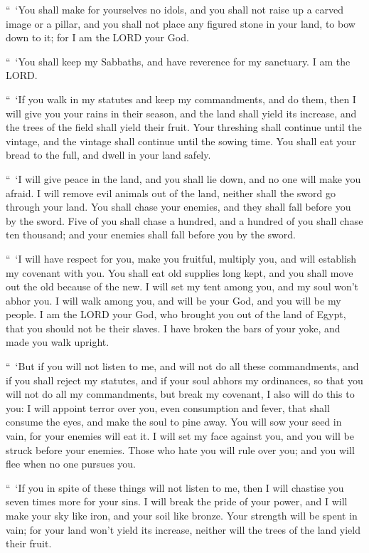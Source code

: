 \mychapter{} \myverse*{}“ ‘You shall make for yourselves no idols, and you shall not raise
up a carved image or a pillar, and you shall not place any figured stone in your land, to bow down to
it; for I am the LORD your God.


\myverse{}“ ‘You shall keep my Sabbaths, and have reverence for my sanctuary.
I am the LORD.


\myverse{}“ ‘If you walk in my statutes and keep my commandments, and do
them,
\myverse{}then I will give you your rains in their season, and the land shall yield its
increase, and the trees of the field shall yield their fruit.
\myverse{}Your threshing shall continue until the vintage, and the vintage shall continue
until the sowing time. You shall eat your bread to the full, and dwell in your land safely.


\myverse{}“ ‘I will give peace in the land, and you shall lie down, and no
one will make you afraid. I will remove evil animals out of the land, neither shall the sword go through
your land.
\myverse{}You shall chase your enemies, and they shall fall before you by the sword.
\myverse{}Five of you shall chase a hundred, and a hundred of you shall chase ten thousand;
and your enemies shall fall before you by the sword.


\myverse{}“ ‘I will have respect for you, make you fruitful, multiply you,
and will establish my covenant with you.
\myverse{}You shall eat old supplies long kept, and you shall move out the old because
of the new.
\myverse{}I will set my tent among you, and my soul won’t abhor you.
\myverse{}I will walk among you, and will be your God, and you will be my people.
\myverse{}I am the LORD your God, who brought you out of the land of Egypt, that you
should not be their slaves. I have broken the bars of your yoke, and made you walk upright.


\myverse{}“ ‘But if you will not listen to me, and will not do all these
commandments,
\myverse{}and if you shall reject my statutes, and if your soul abhors my ordinances,
so that you will not do all my commandments, but break my covenant,
\myverse{}I also will do this to you: I will appoint terror over you, even consumption
and fever, that shall consume the eyes, and make the soul to pine away. You will sow your seed in vain,
for your enemies will eat it.
\myverse{}I will set my face against you, and you will be struck before your enemies.
Those who hate you will rule over you; and you will flee when no one pursues you.


\myverse{}“ ‘If you in spite of these things will not listen to me, then
I will chastise you seven times more for your sins.
\myverse{}I will break the pride of your power, and I will make your sky like iron,
and your soil like bronze.
\myverse{}Your strength will be spent in vain; for your land won’t yield its increase,
neither will the trees of the land yield their fruit.


